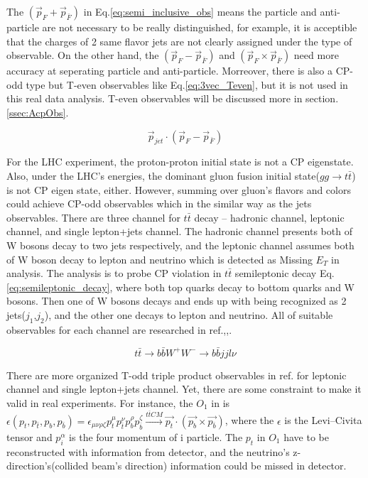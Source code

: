 		The $(\vec{p}_F + \vec{p}_{\bar{F}})$ in Eq.\ref{eq:semi_inclusive_obs} means the particle and anti-particle are not necessary to be really distinguished, for example, it is acceptible that the charges of 2 same flavor jets are not clearly assigned under the type of observable. On the other hand, the $(\vec{p}_F - \vec{p}_{\bar{F}})$ and $(\vec{p}_F \times \vec{p}_{\bar{F}})$ need more accuracy at seperating particle and anti-particle. Morreover, there is also a CP-odd type but T-even observables like Eq.\ref{eq:3vec_Teven}, but it is not used in this real data analysis. T-even observables will be discussed more in section.\ref{ssec:AcpObs}.

		\begin{equation}
		\vec{p}_{jet} \cdot ( \vec{p}_F - \vec{p}_{\bar{F}} )
		\label{eq:3vec_Teven}
		\end{equation}
		\FloatBarrier


		For the LHC experiment, the proton-proton initial state is not a CP eigenstate. Also, under the LHC's energies, the dominant gluon fusion initial state($gg \rightarrow t\bar{t}$) is not CP eigen state, either. However, summing over gluon's flavors and colors could achieve CP-odd observables which in the similar way as the jets observables. There are three channel for $t\bar{t}$ decay -- hadronic channel, leptonic channel, and single lepton+jets channel. The hadronic channel presents both of W bosons decay to two jets respectively, and the leptonic channel assumes both of W boson decay to lepton and neutrino which is detected as Missing $E_T$ in analysis. The analysis is to probe CP violation in $t\bar{t}$ semileptonic decay Eq.\ref{eq:semileptonic_decay}, where both top quarks decay to bottom quarks and W bosons. Then one of W bosons decays and ends up with being recognized as 2 jets($j_1$,$j_2$), and the other one decays to lepton and neutrino. All of suitable observables for each channel are researched in ref.\cite{PhysRevD.80.034013},\cite{PhysRevD.81.034013},\cite{Hayreter:2015ryk}.

		\begin{equation}
		t\bar{t} \rightarrow b\bar{b} W^+W^- \rightarrow b\bar{b} jj l \nu
		\label{eq:semileptonic_decay}
		\end{equation}
		\FloatBarrier

		There are more organized T-odd triple product observables in ref.\cite{Hayreter:2015ryk} for leptonic channel and single lepton+jets channel. Yet, there are some constraint to make it valid in real experiments. For instance, the $O_1$ in\cite{Hayreter:2015ryk} is $\epsilon(p_t,p_{\bar{t}},p_b,p_{\bar{b}}) = \epsilon_{\mu \nu \rho \zeta}p_t^{\mu}p_{\bar{t}}^{\nu}p_b^{\rho}p_{\bar{b}}^{\zeta} \xrightarrow[]{t\overline{t}CM} \vec{p_t} \cdot ( \vec{p_b} \times \vec{p_{\overline{b}}} )$, where the $\epsilon$ is the Levi–Civita tensor and $p_i^{\alpha}$ is the four momentum of i particle. The $p_t$ in $O_1$ have to be reconstructed with information from detector, and the neutrino's z-direction's(collided beam's direction) information could be missed in detector.

